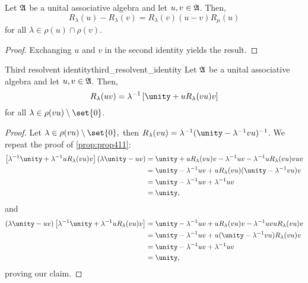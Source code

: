 \begin{corollary}
    Let \(\mathfrak{A}\) be a unital associative algebra and let \(u, v \in \mathfrak{A}\). Then,
    \begin{equation*}
        R_{\lambda}(u) - R_{\lambda}(v) = R_{\lambda}(v) (u - v) R_{\mu}(u)
    \end{equation*}
    for all \(\lambda \in \rho(u) \cap \rho(v)\).
\end{corollary}
\begin{proof}
    Exchanging \(u\) and \(v\) in the second identity yields the result.
\end{proof}
\begin{proposition}{Third resolvent identity}{third_resolvent_identity}
    Let \(\mathfrak{A}\) be a unital associative algebra and let \(u, v \in \mathfrak{A}\). Then,
    \begin{equation*}
        R_{\lambda}(uv) = \lambda^{-1}\left[\unity + uR_{\lambda}(vu)v\right]
    \end{equation*}
    for all \(\lambda \in \rho(vu)\setminus\set{0}\).
\end{proposition}
\begin{proof}
    Let \(\lambda \in \rho(vu)\setminus\set{0},\) then \(R_{\lambda}(vu) = \lambda^{-1}(\unity - \lambda^{-1}vu)^{-1}\). We repeat the proof of \cref{prop:prop411}:
    \begin{align*}
        \left[\lambda^{-1}\unity + \lambda^{-1}uR_{\lambda}(vu)v\right](\lambda\unity - uv)
        &= \unity + uR_{\lambda}(vu)v - \lambda^{-1}uv - \lambda^{-1}uR_{\lambda}(vu)vuv\\
        &= \unity - \lambda^{-1}uv + uR_{\lambda}(vu)(\unity - \lambda^{-1}vu)v\\
        &= \unity - \lambda^{-1}uv + \lambda^{-1}uv\\
        &= \unity,
    \end{align*}
    and
    \begin{align*}
        (\lambda\unity - uv)\left[\lambda^{-1}\unity + \lambda^{-1}uR_{\lambda}(vu)v\right]
        &= \unity - \lambda^{-1}uv + uR_{\lambda}(vu)v - \lambda^{-1}uvuR_{\lambda}(vu)v\\
        &= \unity - \lambda^{-1}uv + u(\unity - \lambda^{-1}vu)R_{\lambda}(vu)v\\
        &= \unity - \lambda^{-1}uv + \lambda^{-1}uv\\
        &= \unity,
    \end{align*}
    proving our claim.
\end{proof}


